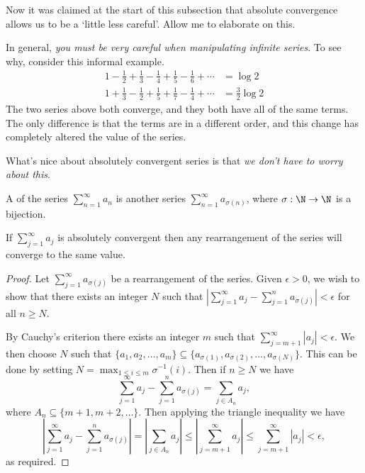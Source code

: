 Now it was claimed at the start of this subsection that absolute convergence allows us to be a `little less careful'. Allow me to elaborate on this. 


In general, \emph{\color{red} you must be very careful when manipulating infinite series}. To see why, consider this informal example.
\begin{align*}
	1-\frac{1}{2}+\frac{1}{3}-\frac{1}{4}+\frac{1}{5}-\frac{1}{6}+\cdots &= \log 2 \\
	1+\frac{1}{3}-\frac{1}{2}+\frac{1}{5}+\frac{1}{7}-\frac{1}{4}+\cdots &= \frac{3}{2} \log 2
\end{align*}
The two series above both converge, and they both have all of the same terms. The only difference is that the terms are in a different order, and this change has completely altered the value of the series.

What's nice about absolutely convergent series is that \emph{we don't have to worry about this}.

\begin{definition}[Rearrangement]
	A  of the series $\sum_{n = 1}^{\infty} a_n$ is another series $\sum_{n = 1}^{\infty} a_{\sigma(n)}$, where $\sigma : \N \rightarrow \N$ is a bijection.
\end{definition}

\begin{theorem}
	If $\sum_{j = 1}^{\infty} a_j$ is absolutely convergent then any rearrangement of the series will converge to the same value.
\end{theorem}
\begin{proof}
Let $\sum_{j = 1}^{\infty} a_{\sigma(j)}$ be a rearrangement of the series. Given $\epsilon > 0$, we wish to show that there exists an integer $N$ such that $|\sum_{j = 1}^{\infty} a_j - \sum_{j = 1}^n a_{\sigma(j)}| < \epsilon$ for all $n \geq N$.

By Cauchy's criterion there exists an integer $m$ such that $\sum_{j = m + 1}^{\infty} |a_j| < \epsilon$.
We then choose $N$ such that $\{a_1, a_2, \dots, a_m\} \subseteq \{a_{\sigma(1)}, a_{\sigma(2)}, \dots, a_{\sigma(N)}\}$. This can be done by setting $N = \max_{1 \leq i \leq m} \sigma^{-1}(i)$.
Then if $n \geq N$ we have
$$
\sum_{j = 1}^{\infty} a_j - \sum_{j = 1}^n a_{\sigma(j)} = \sum_{j \in A_n} a_j,
$$
where $A_n \subseteq \{m + 1, m + 2, \dots \}$. 
Then applying the triangle inequality we have
$$
\left|\sum_{j = 1}^{\infty} a_j - \sum_{j = 1}^n a_{\sigma(j)}\right| = \left|\sum_{j \in A_n} a_j\right| \leq \left|\sum_{j = m + 1}^{\infty} a_j \right| \leq \sum_{j = m + 1}^{\infty} |a_j| < \epsilon,
$$
as required.
\end{proof}

